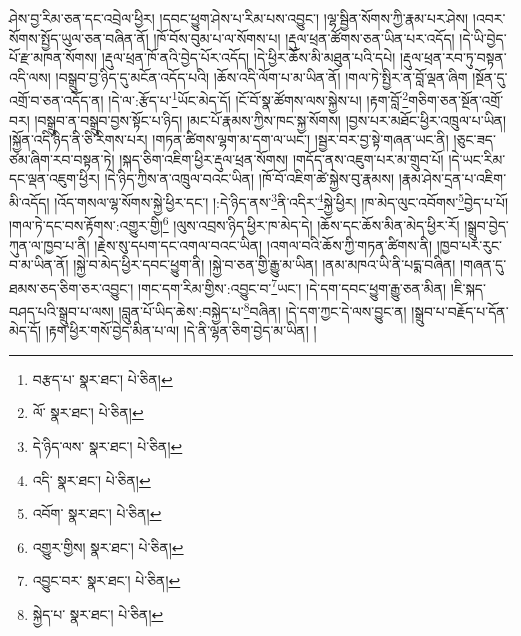 ཤེས་བྱ་རིམ་ཅན་དང་འབྲེལ་ཕྱིར། །དབང་ཕྱུག་ཤེས་པ་རིམ་པས་འབྱུང་། །ལྷ་སྦྱིན་སོགས་ཀྱི་རྣམ་པར་ཤེས། །འབར་སོགས་སྤྱོད་ཡུལ་ཅན་བཞིན་ནོ། །ཁོ་བོས་བུམ་པ་ལ་སོགས་པ། །རྡུལ་ཕྲན་ཚོགས་ཅན་ཡིན་པར་འདོད། །དེ་ཡི་བྱེད་པོ་རྫ་མཁན་སོགས། །རྡུལ་ཕྲན་ཁོ་ནའི་བྱེད་པོར་འདོད། །དེ་ཕྱིར་ཆོས་མི་མཐུན་པའི་དཔེ། །རྡུལ་ཕྲན་རབ་ཏུ་བསྟན་འདི་ལས། །བསྒྲུབ་བྱ་ཉིད་དུ་མངོན་འདོད་པའི། །ཆོས་འདི་ལོག་པ་མ་ཡིན་ནོ། །གལ་ཏེ་སྤྱིར་ན་བློ་ལྡན་ཞིག །སྔོན་དུ་འགྲོ་བ་ཅན་འདོད་ན། །དེ་ལ་:རྩོད་པ་\footnote{བརྩད་པ་  སྣར་ཐང་།  པེ་ཅིན། }ཡོང་མེད་དོ། །ངོ་བོ་སྣ་ཚོགས་ལས་སྐྱེས་པ། །རྟག་བློ་\footnote{ལོ་  སྣར་ཐང་།  པེ་ཅིན། }གཅིག་ཅན་སྔོན་འགྲོ་བར། །བསྒྲུབ་ན་བསྒྲུབ་བྱས་སྟོང་པ་ཉིད། །མང་པོ་རྣམས་ཀྱིས་ཁང་སྐྱ་སོགས། །བྱས་པར་མཐོང་ཕྱིར་འཁྲུལ་པ་ཡིན། །སྐྱོན་འདི་ཉིད་ནི་ཅི་རིགས་པར། །གཏན་ཚིགས་ལྷག་མ་དག་ལ་ཡང་། །སྦྱར་བར་བྱ་སྟེ་གཞན་ཡང་ནི། །ཅུང་ཟད་ཙམ་ཞིག་རབ་བསྟན་ཏེ། །སྐད་ཅིག་འཇིག་ཕྱིར་རྡུལ་ཕྲན་སོགས། །གདོད་ནས་འཇུག་པར་མ་གྲུབ་པོ། །དེ་ཡང་རིམ་དང་ལྡན་འཇུག་ཕྱིར། །དེ་ཉིད་ཀྱིས་ན་འཁྲུལ་བའང་ཡིན། །ཁོ་བོ་འཇིག་ཚེ་སྐྱེས་བུ་རྣམས། །རྣམ་ཤེས་དྲན་པ་འཇིག་མི་འདོད། །འོད་གསལ་ལྷ་སོགས་སྐྱེ་ཕྱིར་དང་། །:དེ་ཉིད་ནས་\footnote{དེ་ཉིད་ལས་  སྣར་ཐང་།  པེ་ཅིན། }ནི་འདིར་\footnote{འདི་  སྣར་ཐང་།  པེ་ཅིན། }སྐྱེ་ཕྱིར། །ཁ་མེད་ལུང་འབོགས་\footnote{འབོག་  སྣར་ཐང་།  པེ་ཅིན། }བྱེད་པ་པོ། །གལ་ཏེ་དང་བས་རྟོགས་:འགྱུར་གྱི།\footnote{འགྱུར་གྱིས།  སྣར་ཐང་།  པེ་ཅིན། } །ལུས་འབྲས་ཉིད་ཕྱིར་ཁ་མེད་དེ། །ཆོས་དང་ཆོས་མིན་མེད་ཕྱིར་རོ། །སྒྲུབ་བྱེད་ཀུན་ལ་ཁྱབ་པ་ནི། །རྗེས་སུ་དཔག་དང་འགལ་བའང་ཡིན། །འགལ་བའི་ཆོས་ཀྱི་གཏན་ཚིགས་ནི། །ཁྱབ་པར་རུང་བ་མ་ཡིན་ནོ། །སྐྱེ་བ་མེད་ཕྱིར་དབང་ཕྱུག་ནི། །སྐྱེ་བ་ཅན་གྱི་རྒྱུ་མ་ཡིན། །ནམ་མཁའ་ཡི་ནི་པདྨ་བཞིན། །གཞན་དུ་ཐམས་ཅད་ཅིག་ཅར་འབྱུང་། །གང་དག་རིམ་གྱིས་:འབྱུང་བ་\footnote{འབྱུང་བར་  སྣར་ཐང་།  པེ་ཅིན། }ཡང་། །དེ་དག་དབང་ཕྱུག་རྒྱུ་ཅན་མིན། །ཇི་སྐད་བཤད་པའི་སྒྲུབ་པ་ལས། །བླུན་པོ་ཡིད་ཆེས་:བསྐྱེད་པ་\footnote{སྐྱེད་པ་  སྣར་ཐང་།  པེ་ཅིན། }བཞིན། །དེ་དག་ཀྱང་དེ་ལས་བྱུང་ན། །སྒྲུབ་པ་བརྗོད་པ་དོན་མེད་དོ། །རྟག་ཕྱིར་གསོ་བྱེད་མིན་པ་ལ། །དེ་ནི་ལྷན་ཅིག་བྱེད་མ་ཡིན། །
